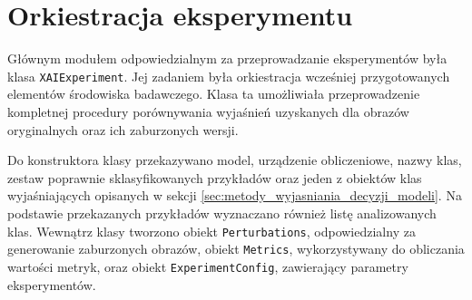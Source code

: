\section{Orkiestracja eksperymentu}
\label{sec:orkiestracja_eksperymentu}

Głównym modułem odpowiedzialnym za przeprowadzanie eksperymentów była klasa \texttt{XAIExperiment}. Jej zadaniem była orkiestracja wcześniej przygotowanych elementów środowiska badawczego. Klasa ta umożliwiała przeprowadzenie kompletnej procedury porównywania wyjaśnień uzyskanych dla obrazów oryginalnych oraz ich zaburzonych wersji.

Do konstruktora klasy przekazywano model, urządzenie obliczeniowe, nazwy klas, zestaw poprawnie sklasyfikowanych przykładów oraz jeden z obiektów klas wyjaśniających opisanych w sekcji \ref{sec:metody_wyjasniania_decyzji_modeli}. Na podstawie przekazanych przykładów wyznaczano również listę analizowanych klas. Wewnątrz klasy tworzono obiekt \texttt{Perturbations}, odpowiedzialny za generowanie zaburzonych obrazów, obiekt \texttt{Metrics}, wykorzystywany do obliczania wartości metryk, oraz obiekt \texttt{ExperimentConfig}, zawierający parametry eksperymentów.

